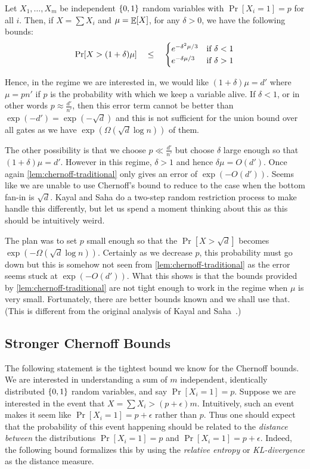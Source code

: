 \begin{lemma}\label{lem:chernoff-traditional}
Let $X_1,\ldots, X_m$ be independent $\left\{0,1\right\}$ random variables with $\Pr[X_i = 1] = p$ for all $i$. Then, if $X = \sum X_i$ and $\mu = \mathop{\mathbb{E}}[X]$, for any $\delta > 0$, we have the following bounds:
\[
\Pr[ X > (1 + \delta) \mu ] \quad \leq \quad \begin{cases}
e^{-\delta^2 \mu/3} & \text{if }\delta < 1\\
e^{-\delta \mu/3} & \text{if }\delta > 1
\end{cases}
\]
\end{lemma}
Hence, in the regime we are interested in, we would like $(1+\delta)\mu = d'$ where $\mu = p n'$ if $p$ is the probability with which we keep a variable alive. If $\delta < 1$, or in other words $p \approx \frac{d'}{n'}$, then this error term cannot be better than $\exp(-d') = \exp(-\sqrt{d})$ and this is not sufficient for the union bound over all gates as we have $\exp(\Omega(\sqrt{d}\log n))$ of them. 

The other possibility is that we choose $p \ll \frac{d'}{n'}$ but choose $\delta$ large enough so that $(1+ \delta)\mu = d'$.
However in this regime, $\delta > 1$ and hence $\delta\mu = O(d')$.
Once again \autoref{lem:chernoff-traditional} only gives an error of $\exp(-O(d'))$. Seems like we are unable to use Chernoff's bound to reduce to the case when the bottom fan-in is $\sqrt{d}$. Kayal and Saha \cite{KayalSaha14} do a two-step random restriction process to make handle this differently, but let us spend a moment thinking about this as this should be intuitively weird. 


The plan was to set $p$ small enough so that the $\Pr[X > \sqrt{d}]$ becomes $\exp(-\Omega(\sqrt{d} \log n))$.
Certainly as we decrease $p$, this probability must go down but this is somehow not seen from \autoref{lem:chernoff-traditional} as the error seems stuck at $\exp(-O(d'))$.
What this shows is that the bounds provided by \autoref{lem:chernoff-traditional} are not tight enough to work in the regime when $\mu$ is very small. Fortunately, there are better bounds known and we shall use that. (This is different from the original analysis of Kayal and Saha~\cite{KayalSaha14}.) 

\subsection{Stronger Chernoff Bounds}

The following statement is the tightest bound we know for the Chernoff bounds.
We are interested in understanding a sum of $m$ independent, identically distributed $\left\{0,1\right\}$ random variables, and say $\Pr[X_i = 1] = p$.
Suppose we are interested in the event that $X = \sum X_i > (p + \epsilon)m$.
Intuitively, such an event makes it seem like $\Pr[X_i = 1] = p+\epsilon$ rather than $p$.
Thus one should expect that the probability of this event happening should be related to the \emph{distance between} the distributions $\Pr[X_i=1]= p$ and $\Pr[X_i = 1] = p+\epsilon$. Indeed, the following bound formalizes this by using the \emph{relative entropy} or \emph{KL-divergence} as the distance measure. 

